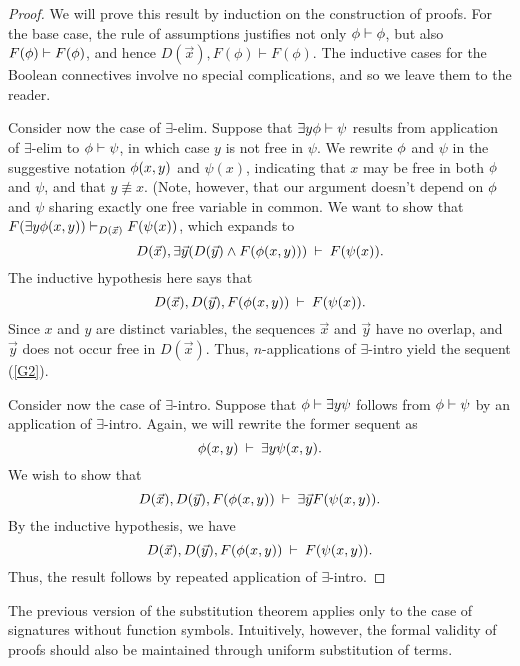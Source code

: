\begin{proof} We will prove this result by induction on the
  construction of proofs.  For the base case, the rule of assumptions
  justifies not only $\phi\vdash\phi$, but also $F(\phi )\vdash F(\phi )$,
  and hence $D(\vec{x}),F(\phi )\vdash F(\phi )$. The inductive cases
  for the Boolean connectives involve no special complications, and so
  we leave them to the reader.

  Consider now the case of $\exists$-elim.  Suppose that
  $\exists y\phi \vdash \psi$ results from application of
  $\exists$-elim to $\phi\vdash\psi$, in which case $y$ is not free in
  $\psi$.  We rewrite $\phi$ and $\psi$ in the suggestive notation
  $\phi (x,y)$ and $\psi (x)$, indicating that $x$ may be free in both
  $\phi$ and $\psi$, and that $y\not\equiv x$.  (Note, however, that
  our argument doesn't depend on $\phi$ and $\psi$ sharing exactly one
  free variable in common.  We want to show that
  $F(\exists y\phi (x,y))\vdash _{D(\vec{x})}F(\psi (x))$, which
  expands to
  \begin{equation} D(\vec{x}),\exists \vec{y}(D(\vec{y})\wedge F(\phi
    (x,y))) \: \vdash \: F(\psi (x)) . \label{G2} \end{equation} The
  inductive hypothesis here says that
  \[ D(\vec{x}),D(\vec{y}),F(\phi (x,y)) \:\vdash \: F(\psi (x)) .\]
  Since $x$ and $y$ are distinct variables, the sequences $\vec{x}$
  and $\vec{y}$ have no overlap, and $\vec{y}$ does not occur free in
  $D(\vec{x})$.  Thus, $n$-applications of $\exists$-intro yield the
  sequent (\ref{G2}).

  Consider now the case of $\exists$-intro.  Suppose that
  $\phi\vdash \exists y\psi$ follows from $\phi\vdash\psi$ by an
  application of $\exists$-intro.  Again, we will rewrite the former
  sequent as
  \[ \phi (x,y)\: \vdash \: \exists y\psi (x,y) .\]
  We wish to show that
  \[ D(\vec{x}),D(\vec{y}),F(\phi (x,y)) \: \vdash \: \exists
    \vec{y}F(\psi (x,y)) .\] By the inductive hypothesis, we have
  \[ D(\vec{x}),D(\vec{y}),F(\phi(x,y))\: \vdash \: F(\psi (x,y)) .\]
  Thus, the result follows by repeated application of $\exists$-intro.
\end{proof}

The previous version of the substitution theorem applies only to the
case of signatures without function symbols.  Intuitively, however,
the formal validity of proofs should also be maintained through
uniform substitution of terms.

